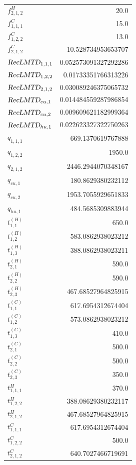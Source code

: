 \documentclass{article}%
\begin{document}
\begin{multicols*}{3}
\begin{supertabular}{lr}
	$f_{2,1,2}^{H}$ & 20.0 \\%
	$f_{1,1,1}^{C}$ & 15.0 \\%
	$f_{1,2,2}^{C}$ & 13.0 \\%
	$f_{2,1,2}^{C}$ & 10.528734953653707 \\%
	$\textsl{RecLMTD}_{1,1,1}$ & 0.052573091327292286 \\%
	$\textsl{RecLMTD}_{1,2,2}$ & 0.01733351766313226 \\%
	$\textsl{RecLMTD}_{2,1,2}$ & 0.030089246375065732 \\%
	$\textsl{RecLMTD}_{cu,1}$ & 0.014484559287986854 \\%
	$\textsl{RecLMTD}_{cu,2}$ & 0.009609621182999364 \\%
	$\textsl{RecLMTD}_{hu,1}$ & 0.022623327322750263 \\%
	$q_{1,1,1}$ & 669.1370619767888 \\%
	$q_{1,2,2}$ & 1950.0 \\%
	$q_{2,1,2}$ & 2446.2944070348167 \\%
	$q_{cu,1}$ & 180.8629380232112 \\%
	$q_{cu,2}$ & 1953.7055929651833 \\%
	$q_{hu,1}$ & 484.5685309883944 \\%
	$t_{1,1}^{(H)}$ & 650.0 \\%
	$t_{1,2}^{(H)}$ & 583.0862938023212 \\%
	$t_{1,3}^{(H)}$ & 388.0862938023211 \\%
	$t_{2,1}^{(H)}$ & 590.0 \\%
	$t_{2,2}^{(H)}$ & 590.0 \\%
	$t_{2,3}^{(H)}$ & 467.68527964825915 \\%
	$t_{1,1}^{(C)}$ & 617.6954312674404 \\%
	$t_{1,2}^{(C)}$ & 573.0862938023212 \\%
	$t_{1,3}^{(C)}$ & 410.0 \\%
	$t_{2,1}^{(C)}$ & 500.0 \\%
	$t_{2,2}^{(C)}$ & 500.0 \\%
	$t_{2,3}^{(C)}$ & 350.0 \\%
	$t_{1,1,1}^{H}$ & 370.0 \\%
	$t_{1,2,2}^{H}$ & 388.08629380232117 \\%
	$t_{2,1,2}^{H}$ & 467.68527964825915 \\%
	$t_{1,1,1}^{C}$ & 617.6954312674404 \\%
	$t_{1,2,2}^{C}$ & 500.0 \\%
	$t_{2,1,2}^{C}$ & 640.7027466719691 \\%

\end{supertabular}
\end{multicols*}
\end{document}

